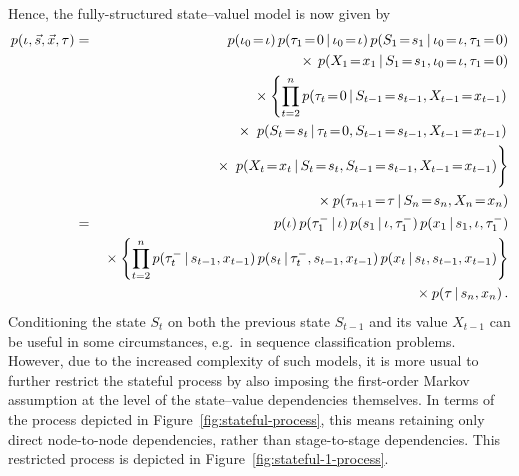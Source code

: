 \documentclass[a4paper]{article}
\newcommand{\tm}{\tau^{-}}
\begin{document}
Hence, the fully-structured state--valuel model is now given by
\begin{eqnarray}
p({\iota},\vec{s},\vec{x},{\tau}) & = & 
p(\iota_0\!=\!{\iota})\,p(\tau_1\!=\!0\,|\,\iota_0\!=\!{\iota})
\,p(S_1\!=\!s_1\,|\,\iota_0\!=\!{\iota},\tau_1\!=\!0)
\nonumber\\&&{}\times
\,p(X_1\!=\!x_1\,|\,S_1\!=\!s_1,\iota_0\!=\!{\iota},\tau_1\!=\!0)
\nonumber\\&&
{}\times\left\{\prod_{t=2}^{n}p(\tau_t\!=\!0\,|\,S_{t-1}\!=\!s_{t-1},X_{t-1}\!=\!x_{t-1})\right.
\nonumber\\&&\hspace*{10mm}{}\times\left.
\,p(S_t\!=\!s_t\,|\,\tau_t\!=\!0,S_{t-1}\!=\!s_{t-1},X_{t-1}\!=\!x_{t-1})\right.
\nonumber\\&&\hspace*{10mm}{}\times\left.\rule{0pt}{6mm}
\,p(X_t\!=\!x_t\,|\,S_t\!=\!s_t,S_{t-1}\!=\!s_{t-1},X_{t-1}\!=\!x_{t-1})\right\}
\nonumber\\&&
{}\times p(\tau_{n+1}\!=\!{\tau}\,|\,S_n\!=\!s_n,X_n\!=\!x_n)
\nonumber\\
&=&
p({\iota})\,p(\tm_1\,|\,{\iota})
\,p(s_1\,|\,{\iota},\tm_1)
\,p(x_1\,|\,s_1,{\iota},\tm_1)
\nonumber\\&&
{}\times\left\{\prod_{t=2}^{n}p(\tm_t\,|\,s_{t-1},x_{t-1})
\,p(s_t\,|\,\tm_t,s_{t-1},x_{t-1})
\,p(x_t\,|\,s_t,s_{t-1},x_{t-1})\right\}
\nonumber\\&&
{}\times p({\tau}\,|\,s_n,x_n)
\,.
\end{eqnarray}
Conditioning the state $S_t$ on both the previous state $S_{t-1}$ and its value $X_{t-1}$
can be useful in some circumstances, e.g.\ in sequence classification problems.
However, due to the increased complexity of such models, it is more usual to further restrict the stateful process
by also imposing the first-order Markov assumption at the level
of the state--value dependencies themselves. In terms of the process depicted in Figure~\ref{fig:stateful-process},
this means retaining only direct node-to-node dependencies, rather than stage-to-stage dependencies.
This restricted process is depicted in Figure~\ref{fig:stateful-1-process}.
\end{document}
